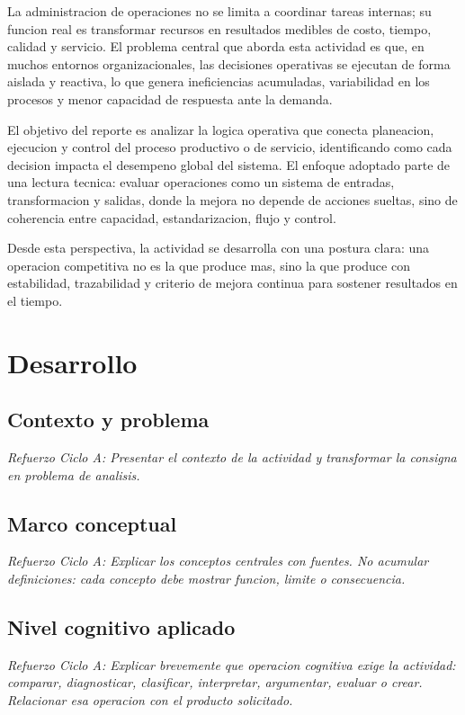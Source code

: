 \documentclass[
	spanish,
	letterpaper, oneside
]{article}
\begin{document}
La administracion de operaciones no se limita a coordinar tareas internas; su funcion real es transformar recursos en resultados medibles de costo, tiempo, calidad y servicio. El problema central que aborda esta actividad es que, en muchos entornos organizacionales, las decisiones operativas se ejecutan de forma aislada y reactiva, lo que genera ineficiencias acumuladas, variabilidad en los procesos y menor capacidad de respuesta ante la demanda.

El objetivo del reporte es analizar la logica operativa que conecta planeacion, ejecucion y control del proceso productivo o de servicio, identificando como cada decision impacta el desempeno global del sistema. El enfoque adoptado parte de una lectura tecnica: evaluar operaciones como un sistema de entradas, transformacion y salidas, donde la mejora no depende de acciones sueltas, sino de coherencia entre capacidad, estandarizacion, flujo y control.

Desde esta perspectiva, la actividad se desarrolla con una postura clara: una operacion competitiva no es la que produce mas, sino la que produce con estabilidad, trazabilidad y criterio de mejora continua para sostener resultados en el tiempo.

\section{Desarrollo}

\subsection{Contexto y problema}

\textit{Refuerzo Ciclo A: Presentar el contexto de la actividad y transformar la consigna en problema de analisis.}

\subsection{Marco conceptual}

\textit{Refuerzo Ciclo A: Explicar los conceptos centrales con fuentes. No acumular definiciones: cada concepto debe mostrar funcion, limite o consecuencia.}

\subsection{Nivel cognitivo aplicado}

\textit{Refuerzo Ciclo A: Explicar brevemente que operacion cognitiva exige la actividad: comparar, diagnosticar, clasificar, interpretar, argumentar, evaluar o crear. Relacionar esa operacion con el producto solicitado.}
\end{document}
